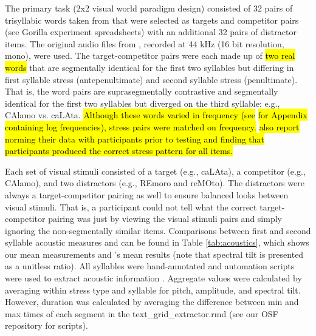 The primary task (2x2 visual world paradigm design) consisted of 32 pairs of trisyllabic words taken from \cite{Sulpizio_McQueen_2012} that were selected as targets and competitor pairs (see Gorilla experiment spreadsheets) with an additional 32 pairs of distractor items. The original audio files from \cite{Sulpizio_McQueen_2012}, recorded at 44 kHz (16 bit resolution, mono), were used. The target-competitor pairs were each made up of \hl{two real words} that are segmentally identical for the first two syllables but differing in first syllable stress (antepenultimate) and second syllable stress (penultimate). That is, the word pairs are suprasegmentally contrastive and segmentally identical for the first two syllables but diverged on the third syllable: e.g., CAlamo vs. caLAta. \hl{Although these words varied in frequency (see} \cite{Sulpizio_McQueen_2012} \hl{for Appendix containing log frequencies), stress pairs were matched on frequency.} \cite{Sulpizio_McQueen_2012} \hl{also report norming their data with participants prior to testing and finding that participants produced the correct stress pattern for all items.}

Each set of visual stimuli consisted of a target (e.g., caLAta), a competitor (e.g., CAlamo), and two distractors (e.g., REmoro and reMOto). The distractors were always a target-competitor pairing as well to ensure balanced looks between visual stimuli. That is, a participant could not tell what the correct target-competitor pairing was just by viewing the visual stimuli pairs and simply ignoring the non-segmentally similar items. Comparisons between first and second syllable acoustic measures and can be found in Table \ref{tab:acoustics}, which shows our mean measurements and \cite{Sulpizio_McQueen_2012}'s mean results (note that spectral tilt is presented as a unitless ratio). All syllables were hand-annotated and automation scripts were used to extract acoustic information \citep{qi_textgrid_maker, dicanio_vowel_acoustics}. Aggregate values were calculated by averaging within stress type and syllable for pitch, amplitude, and spectral tilt. However, duration was calculated by averaging the difference between min and max times of each segment in the text\_grid\_extractor.rmd (see our OSF repository for scripts). 

